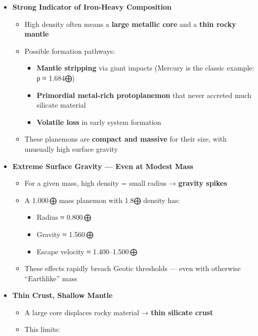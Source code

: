 \documentclass[
  letterpaper,
]{book}
\providecommand{\tightlist}{%
  \setlength{\itemsep}{0pt}\setlength{\parskip}{0pt}}
\begin{document}
\begin{itemize}
\tightlist
\item
  \textbf{Strong Indicator of Iron-Heavy Composition}

  \begin{itemize}
  \tightlist
  \item
    High density often means a \textbf{large metallic core} and a
    \textbf{thin rocky mantle}
  \item
    Possible formation pathways:

    \begin{itemize}
    \tightlist
    \item
      \textbf{Mantle stripping} via giant impacts (Mercury is the
      classic example: ρ ≈ 1.684⨁)
    \item
      \textbf{Primordial metal-rich protoplanemon} that never accreted
      much silicate material
    \item
      \textbf{Volatile loss} in early system formation
    \end{itemize}
  \item
    These planemons are \textbf{compact and massive} for their size,
    with unusually high surface gravity
  \end{itemize}
\item
  \textbf{Extreme Surface Gravity --- Even at Modest Mass}

  \begin{itemize}
  \tightlist
  \item
    For a given mass, high density = small radius → \textbf{gravity
    spikes}
  \item
    A 1.000\,⨁ mass planemon with 1.8⨁ density has:

    \begin{itemize}
    \tightlist
    \item
      Radius ≈ 0.800\,⨁
    \item
      Gravity ≈ 1.560\,⨁
    \item
      Escape velocity ≈ 1.400--1.500\,⨁
    \end{itemize}
  \item
    These effects rapidly breach Geotic thresholds --- even with
    otherwise ``Earthlike'' mass
  \end{itemize}
\item
  \textbf{Thin Crust, Shallow Mantle}

  \begin{itemize}
  \tightlist
  \item
    A large core displaces rocky material → \textbf{thin silicate crust}
  \item
    This limits:


\end{itemize}
\end{itemize}
\end{document}
